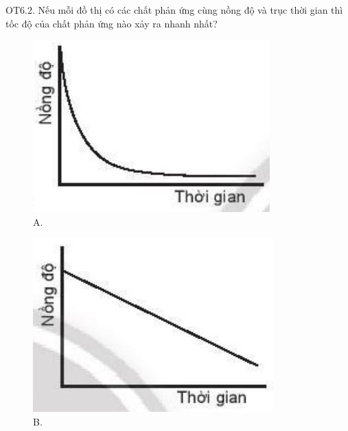 \documentclass[10pt]{article}
\begin{document}
OT6.2. Nếu mỗi đồ thị có các chất phản ứng cùng nồng độ và trục thời gian thì tốc độ của chất phản ứng nào xảy ra nhanh nhất?

\begin{figure}[h]
\begin{center}
\captionsetup{labelformat=empty}
\caption{A.}
  \includegraphics[width=\textwidth]{2025_10_23_883c4b146e2332109fcdg-68(2)}
\end{center}
\end{figure}

\begin{figure}[h]
\begin{center}
\captionsetup{labelformat=empty}
\caption{B.}
  \includegraphics[width=\textwidth]{2025_10_23_883c4b146e2332109fcdg-68(3)}
\end{center}
\end{figure}
\end{document}

